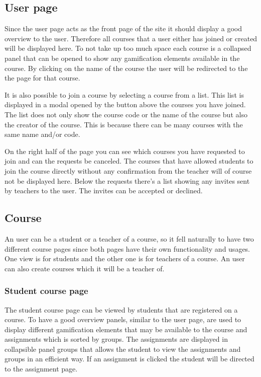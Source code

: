 \subsection{User page}
Since the user page acts as the front page of the site it should display a good overview to the user. Therefore all courses that a user either has joined or created will be displayed here. To not take up too much space each course is a collapsed panel that can be opened to show any gamification elements available in the course. By clicking on the name of the course the user will be redirected to the the page for that course.

It is also possible to join a course by selecting a course from a list. This list is displayed in a modal opened by the button above the courses you have joined.  The list does not only show the course code or the name of the course but also the creator of the course. This is because there can be many courses with the same name and/or code.

On the right half of the page you can see which courses you have requested to join and can the requests be canceled. The courses that have allowed students to join the course directly without any confirmation from the teacher will of course not be displayed here. Below the requests there's a list showing any invites sent by teachers to the user. The invites can be accepted or declined.

\subsection{Course}
An user can be a student or a teacher of a course, so it fell naturally to have two different course pages since both pages have their own functionality and usages. One view is for students and the other one is for teachers of a course. An user can also create courses which it will be a teacher of. 
\subsubsection{Student course page}
The student course page can be viewed by students that are registered on a course. To have a good overview panels, similar to the user page, are used to display different gamification elements that may be available to the course and assignments which is sorted by groups. The assignments are displayed in collapsible panel groups that allows the student to view the assignments and groups in an efficient way. If an assignment is clicked the student will be directed to the assignment page. 

